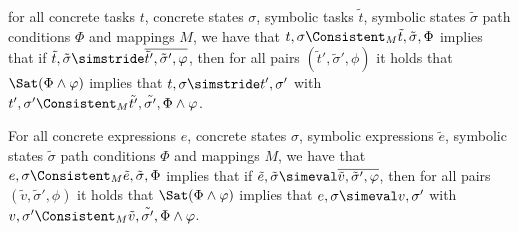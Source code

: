 \begin{lemma}
  \label{lem:soundstride}
  for all concrete tasks $t$, concrete states $\sigma$, symbolic tasks $\tilde{t}$, symbolic states $\tilde{\sigma}$ path conditions $\Phi$ and mappings $M$,
  we have that $t,\sigma\Consistent_{M}\tilde{t},\tilde{\sigma},\Phi$ implies
  that if $\tilde{t},\tilde{\sigma}\simstride\overline{\tilde{t}',\tilde{\sigma}',\phi}$,
  then for all pairs $(\tilde{t}',\tilde{\sigma}',\phi)$ it holds that $\Sat(\Phi\land\phi)$ implies
  that $t,\sigma\simstride t',\sigma'$ with $t',\sigma'\Consistent_{M}\tilde{t'},\tilde{\sigma'},\Phi\land\phi$.
\end{lemma}

\begin{lemma}
  \label{lem:soundeval}
  For all concrete expressions $e$, concrete states $\sigma$, symbolic expressions $\tilde{e}$, symbolic states $\tilde{\sigma}$ path conditions $\Phi$ and mappings $M$,
  we have that $e,\sigma\Consistent_{M}\tilde{e},\tilde{\sigma},\Phi$ implies
  that if $\tilde{e},\tilde{\sigma}\simeval\overline{\tilde{v},\tilde{\sigma}',\phi}$,
  then for all pairs $(\tilde{v},\tilde{\sigma}',\phi)$ it holds that $\Sat(\Phi\land\phi)$ implies
  that $e,\sigma\simeval v,\sigma'$ with $v,\sigma'\Consistent_{M}\tilde{v},\tilde{\sigma'},\Phi\land\phi$.
\end{lemma}


